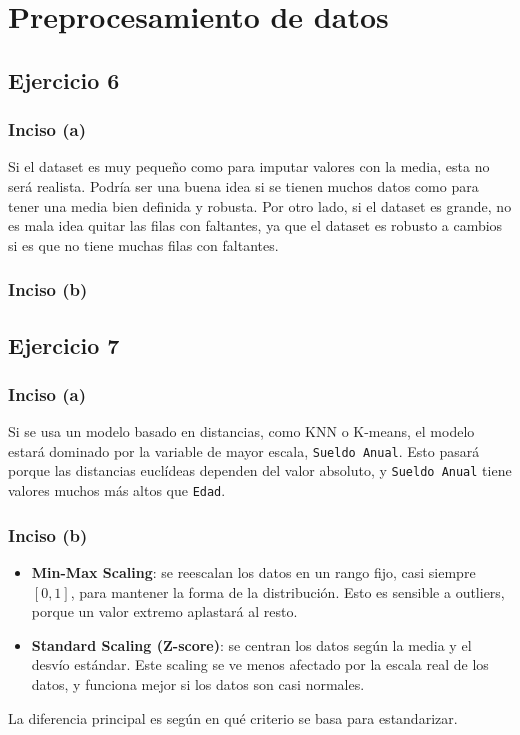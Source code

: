 \documentclass[a4paper,12pt]{article}
\begin{document}
    \section*{Preprocesamiento de datos}
        \subsection*{Ejercicio 6}
            \subsubsection*{Inciso (a)}
                \noindent Si el dataset es muy pequeño como para imputar valores con la media, esta no será realista. Podría ser una buena idea si se tienen muchos datos como para tener una media bien definida y robusta. Por otro lado, si el dataset es grande, no es mala idea quitar las filas con faltantes, ya que el dataset es robusto a cambios si es que no tiene muchas filas con faltantes.
            \subsubsection*{Inciso (b)}
                \noindent 
        \subsection*{Ejercicio 7}
            \subsubsection*{Inciso (a)}
                \noindent Si se usa un modelo basado en distancias, como KNN o K-means, el modelo estará dominado por la variable de mayor escala, \texttt{Sueldo Anual}. Esto pasará porque las distancias euclídeas dependen del valor absoluto, y \texttt{Sueldo Anual} tiene valores muchos más altos que \texttt{Edad}.
            \subsubsection*{Inciso (b)}
                \begin{itemize}
                    \item \textbf{Min-Max Scaling}: se reescalan los datos en un rango fijo, casi siempre \([0, 1]\), para mantener la forma de la distribución. Esto es sensible a outliers, porque un valor extremo aplastará al resto.
                    \item \textbf{Standard Scaling (Z-score)}: se centran los datos según la media y el desvío estándar. Este scaling se ve menos afectado por la escala real de los datos, y funciona mejor si los datos son casi normales.
                \end{itemize}
                \noindent La diferencia principal es según en qué criterio se basa para estandarizar.
\end{document}
